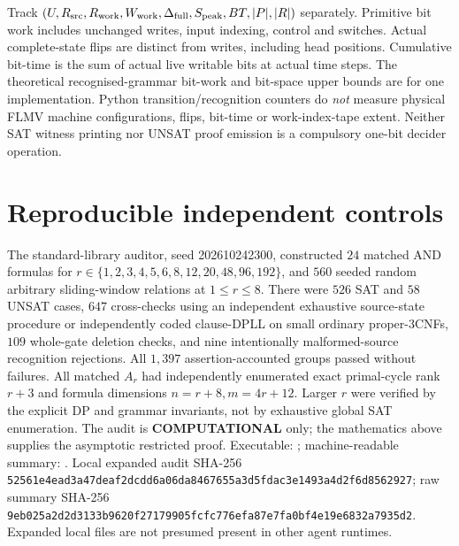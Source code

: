 \documentclass[11pt]{article}
\begin{document}
Track $(U,R_{\rm src},R_{\rm work},W_{\rm work},\Delta_{\rm full},S_{\rm peak},BT,|P|,|R|)$ separately. Primitive bit work includes unchanged writes, input indexing, control and switches. Actual complete-state flips are distinct from writes, including head positions. Cumulative bit-time is the sum of actual live writable bits at actual time steps. The theoretical recognised-grammar bit-work and bit-space upper bounds are for one implementation. Python transition/recognition counters do \emph{not} measure physical FLMV machine configurations, flips, bit-time or work-index-tape extent. Neither SAT witness printing nor UNSAT proof emission is a compulsory one-bit decider operation.

\section{Reproducible independent controls}
The standard-library auditor, seed 202610242300, constructed $24$ matched AND formulas for $r\in\{1,2,3,4,5,6,8,12,20,48,96,192\}$, and $560$ seeded random arbitrary sliding-window relations at $1\le r\le8$. There were $526$ SAT and $58$ UNSAT cases, $647$ cross-checks using an independent exhaustive source-state procedure or independently coded clause-DPLL on small ordinary proper-3CNFs, $109$ whole-gate deletion checks, and nine intentionally malformed-source recognition rejections. All $1,397$ assertion-accounted groups passed without failures. All matched $A_r$ had independently enumerated exact primal-cycle rank $r+3$ and formula dimensions $n=r+8,m=4r+12$. Larger $r$ were verified by the explicit DP and grammar invariants, not by exhaustive global SAT enumeration. The audit is \textbf{COMPUTATIONAL} only; the mathematics above supplies the asymptotic restricted proof.
Executable: ; machine-readable summary: . Local expanded audit SHA-256 \texttt{52561e4ead3a47deaf2dcdd6a06da8467655a3d5fdac3e1493a4d2f6d8562927}; raw summary SHA-256 \texttt{9eb025a2d2d3133b9620f27179905fcfc776efa87e7fa0bf4e19e6832a7935d2}. Expanded local files are not presumed present in other agent runtimes.
\end{document}
